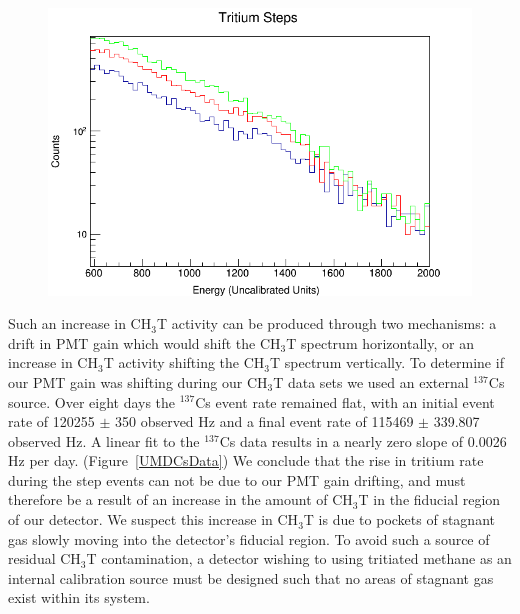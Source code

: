 \begin{figure}
\includegraphics[scale=.35]{Steps_Overlay.png} 
\label{UMDOutgassingSpectra}
\end{figure}

Such an increase in CH$_3$T activity can be produced through two mechanisms: a drift in PMT gain which would shift the CH$_3$T spectrum horizontally, or an increase in CH$_3$T activity shifting the CH$_3$T spectrum vertically. To determine if our PMT gain was shifting during our CH$_3$T data sets we used an external $^{137}$Cs source. Over eight days the $^{137}$Cs event rate remained flat, with an initial event rate of 120255 $\pm$ 350 observed Hz and a final event rate of 115469 $\pm$ 339.807 observed Hz. A linear fit to the $^{137}$Cs data results in a nearly zero slope of 0.0026 Hz per day. (Figure~\ref{UMDCsData}) We conclude that the rise in tritium rate during the step events can not be due to our PMT gain drifting, and must therefore be a result of an increase in the amount of CH$_3$T in the fiducial region of our detector. We suspect this increase in CH$_3$T is due to pockets of stagnant gas slowly moving into the detector's fiducial region. To avoid such a source of residual CH$_3$T contamination, a detector wishing to using tritiated methane as an internal calibration source must be designed such that no areas of stagnant gas exist within its system.  

